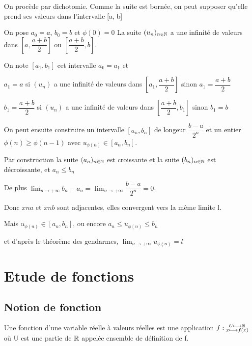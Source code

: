 \documentclass[a4paper, 12pt]{article}
\begin{document}
\begin{demonstration}
    On procède par dichotomie. Comme la suite est bornée, on peut supposer qu'elle
    prend ses valeurs dans l'intervalle [a, b]

    On pose $a_0 = a$, $b_0 = b$ et $\phi(0) = 0$
    La suite $(u_n)_{n \in \mathbb{N}}$ a une infinité de valeurs dans $[a, \dfrac{a+b}{2}]$ ou $[\dfrac{a+b}{2}, b]$.

    On note $[a_1, b_1]$ cet intervalle
    $a_0 = a_1$ et
    
    $a_1 = a$ si $(u_n)$ a une infinité de valeurs dans $[a_1, \dfrac{a+b}{2}]$ sinon $a_1 = \dfrac{a+b}{2}$

    $b_1 = \dfrac{a+b}{2}$ si $(u_n)$ a une infinité de valeurs dans $[\dfrac{a+b}{2}, b_1]$ sinon $b_1 = b$

    On peut ensuite construire un intervalle $[a_n, b_n]$ de longeur $\dfrac{b - a}{2^n}$
    et un entier $\phi(n) \geq \phi(n-1)$ avec $u_{\phi(n)} \in [a_n, b_n]$.

    Par construction la suite $(a_n)_{n \in \mathbb{N}}$ est croissante et la suite $(b_n)_{n \in \mathbb{N}}$ est décroissante,
    et $a_n \leq b_n$

    De plus $\lim_{n \to +\infty}b_n - a_n = \lim_{n \to +\infty} \dfrac{b-a}{2^n} = 0$.

    Donc $xn{a}$ et $xn{b}$ sont adjacentes, elles convergent vers la même limite l.

    Mais $u_{\phi(n)} \in [a_n, b_n]$, ou encore $a_n \leq u_{\phi(n)} \leq b_n$

    et d'après le théorème des gendarmes, $\lim_{n \to +\infty}u_{\phi(n)} = l$
\end{demonstration}

\section{Etude de fonctions}

\subsection{Notion de fonction}

\begin{definition}
    Une fonction d'une variable réelle à valeurs réelles est une application $f: \substack{U \longmapsto \mathbb{R} \\ x \longmapsto f(x)}$ où U est une partie de $\mathbb{R}$ appelée ensemble de définition de f.
\end{definition}
\end{document}
